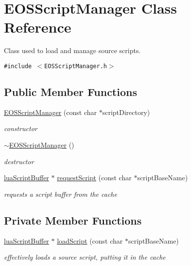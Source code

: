 \hypertarget{classEOSScriptManager}{
\section{EOSScriptManager Class Reference}
\label{classEOSScriptManager}
}
Class used to load and manage source scripts.  


{\tt \#include $<$EOSScriptManager.h$>$}

\subsection*{Public Member Functions}
\begin{CompactItemize}
\item 
\hyperlink{classEOSScriptManager_815c5c06c48751e49450d5f7e9408edb}{EOSScriptManager} (const char $\ast$scriptDirectory)
\begin{CompactList}\small\item\em constructor \item\end{CompactList}\item 
\hyperlink{classEOSScriptManager_8e394b82ab8ee05aaa41d3cb46938486}{$\sim$EOSScriptManager} ()
\begin{CompactList}\small\item\em destructor \item\end{CompactList}\item 
\hyperlink{structluaScriptBuffer}{luaScriptBuffer} $\ast$ \hyperlink{classEOSScriptManager_70aeb04d3b8e91b0ccf11bf66275ce80}{requestScript} (const char $\ast$scriptBaseName)
\begin{CompactList}\small\item\em requests a script buffer from the cache \item\end{CompactList}\end{CompactItemize}
\subsection*{Private Member Functions}
\begin{CompactItemize}
\item 
\hyperlink{structluaScriptBuffer}{luaScriptBuffer} $\ast$ \hyperlink{classEOSScriptManager_36cf095b56f48611eff8b8fa4698b2e3}{loadScript} (const char $\ast$scriptBaseName)
\begin{CompactList}\small\item\em effectively loads a source script, putting it in the cache \item\end{CompactList}\end{CompactItemize}
